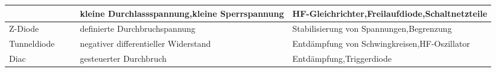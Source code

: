 {\begin{table}[H]
\begin{tabular}{ |p{2.2cm}|p{1.4cm}|p{3.3cm}|p{2.8cm}|p{3.3cm}| }
        &
        \begin{minipage}[t][2.4cm][c]{1.4cm}
            \centering 
        \end{minipage}
        & 
        \begin{minipage}[t][2.4cm][c]{3.3cm}
            \centering 
        \end{minipage}
        & 
        kleine Durchlassspannung,\newline kleine Sperrspannung &
        HF-Gleichrichter,\newline Freilaufdiode,\newline Schaltnetzteile\\
        \hline
        Z-Diode
        &
        \begin{minipage}[t][2.4cm][c]{1.4cm}
            \centering 
        \end{minipage}
        & 
        \begin{minipage}[t][2.4cm][c]{3.3cm}
            \centering 
        \end{minipage}
        & 
        definierte Durchbruchspannung &
        Stabilisierung \newline von Spannungen,\newline Begrenzung\\
        \hline
        Tunnel\-diode
        &
        \begin{minipage}[t][2.4cm][c]{1.4cm}
            \centering 
        \end{minipage}
        & 
        \begin{minipage}[t][2.4cm][c]{3.3cm}
            \centering 
        \end{minipage}
        & 
        negativer differentieller Widerstand &
        Entdämpfung \newline von Schwingkreisen,\newline HF-Oszillator\\
        \hline
        Diac
        &
        \begin{minipage}[t][2.4cm][c]{1.4cm}
            \centering 
        \end{minipage}
        & 
        \begin{minipage}[t][2.4cm][c]{3.3cm}
            \centering 
        \end{minipage}
        & 
        gesteuerter Durchbruch & 
        Entdämpfung,\newline Triggerdiode\\
        \hline
    \end{tabular}
\end{table}
}

